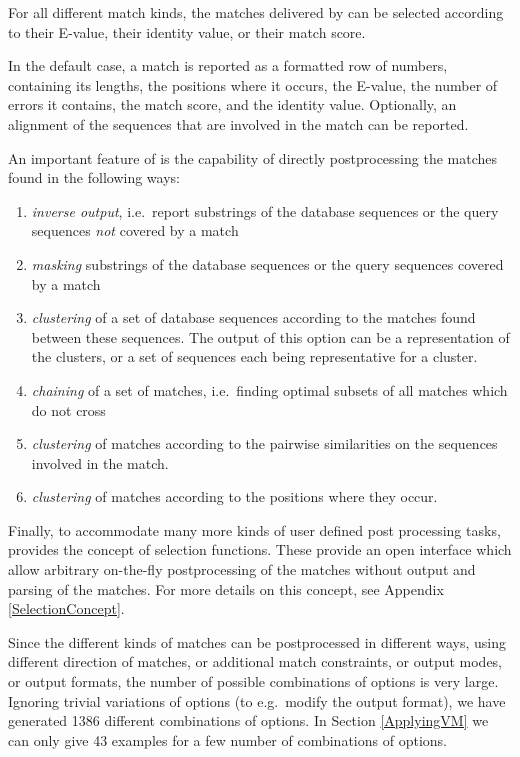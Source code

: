 \documentclass[12pt,titlepage]{article}
\newcommand{\RomanLabels}{
  \renewcommand{\labelenumi}{$(\roman{enumi})$}
  \renewcommand{\theenumi}{(\roman{enumi})}
}
\begin{document}
\begin{AboutVmatch}
For all different match kinds, the matches delivered by \VM can be selected 
according to their E-value, their identity value, or their match score.
  

In the default case, a match is reported as a formatted row of numbers,
containing its lengths, the positions where it occurs, the E-value, 
the number of errors it contains, the match score,
and the identity value. Optionally, an alignment of the sequences that are
involved in the match can be reported.

An important feature of \VM is the capability of directly postprocessing
the matches found in the following ways:

\begin{enumerate}
\RomanLabels
\item
\emph{inverse output}, i.e.\
report substrings of the database sequences or the query sequences
\emph{not} covered by a match
\item
\emph{masking} substrings of the database sequences or the query sequences 
covered by a match
\item
\emph{clustering} of a set of database sequences according to
the matches found between these sequences. The output of this option 
can be a representation of the clusters, or a set of sequences each 
being representative for a cluster.
\item
\emph{chaining} of a set of matches, i.e.\ finding optimal subsets of
all matches which do not cross
\item
\emph{clustering} of matches according to the pairwise similarities
on the sequences involved in the match.
\item
\emph{clustering} of matches according to the positions where they occur.
\end{enumerate}

Finally, to accommodate many more kinds of user defined post
processing tasks, \VM provides the concept of selection functions.
These provide an open interface which allow arbitrary on-the-fly 
postprocessing of the matches without output and parsing of 
the matches. For more details on this concept,
see Appendix \ref{SelectionConcept}.

Since the different kinds of matches can be postprocessed in different
ways, using different direction of matches, or additional match
constraints, or output modes, or output formats,
the number of possible combinations of options is very large. Ignoring
trivial variations of options (to e.g.\ modify the output format),
we have generated 1386 different combinations of options.
In Section \ref{ApplyingVM} we can only give 43 examples for a few number of 
combinations of options.


\end{AboutVmatch}
\end{document}
